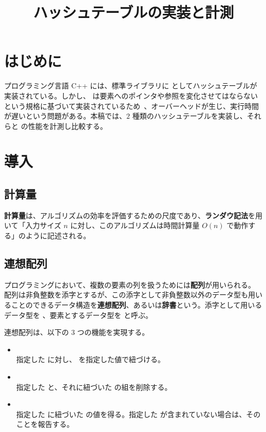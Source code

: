 \documentclass[dvipdfmx,a4j,10pt]{jarticle}
\begin{document}
\title{ハッシュテーブルの実装と計測}
\date{}
\maketitle
\thispagestyle{empty}

\section{はじめに}

プログラミング言語 C++ には、標準ライブラリに  としてハッシュテーブルが実装されている。しかし、 は要素へのポインタや参照を変化させてはならないという規格に基づいて実装されているため~\cite{C++Draft}、オーバーヘッドが生じ、実行時間が遅いという問題がある。本稿では、$2$ 種類のハッシュテーブルを実装し、それらと  の性能を計測し比較する。

\section{導入}

\subsection{計算量}

\textbf{計算量}は、アルゴリズムの効率を評価するための尺度であり、\textbf{ランダウ記法}を用いて「入力サイズ $n$ に対し、このアルゴリズムは時間計算量 $O(n)$ で動作する」のように記述される。

\subsection{連想配列}

プログラミングにおいて、複数の要素の列を扱うためには\textbf{配列}が用いられる。
配列は非負整数を添字とするが、この添字として非負整数以外のデータ型も用いることのできるデータ構造を\textbf{連想配列}、あるいは\textbf{辞書}という。添字として用いるデータ型を 、要素とするデータ型を  と呼ぶ。

連想配列は、以下の $3$ つの機能を実現する。

\begin{itemize}
  \item {} \mbox{}\\ 指定した  に対し、 を指定した値で紐づける。
  \item {} \mbox{}\\ 指定した  と、それに紐づいた  の組を削除する。
  \item {} \mbox{}\\ 指定した  に紐づいた  の値を得る。指定した  が含まれていない場合は、そのことを報告する。
\end{itemize}
\end{document}

